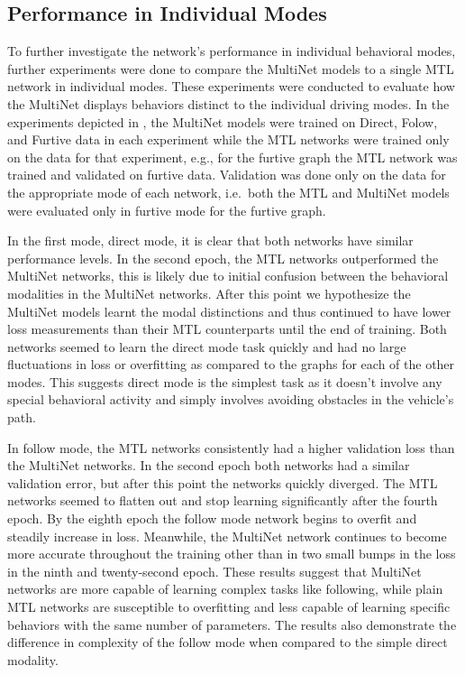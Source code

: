 \subsection{Performance in Individual Modes}
\label{resultspt2}
To further investigate the network's performance in individual behavioral modes, further experiments were done to compare the MultiNet models to a single MTL network in individual modes. These experiments were conducted to evaluate how the MultiNet displays behaviors distinct to the individual driving modes. In the experiments depicted in , the MultiNet models were trained on Direct, Folow, and Furtive data in each experiment while the MTL networks were trained only on the data for that experiment, e.g., for the furtive graph the MTL network was trained and validated on furtive data. Validation was done only on the data for the appropriate mode of each network, i.e.\, both the MTL and MultiNet models were evaluated only in furtive mode for the furtive graph.

In the first mode, direct mode, it is clear that both networks have similar performance levels. In the second epoch, the MTL networks outperformed the MultiNet networks, this is likely due to initial confusion between the behavioral modalities in the MultiNet networks. After this point we hypothesize the MultiNet models learnt the modal distinctions and thus continued to have lower loss measurements than their MTL counterparts until the end of training. Both networks seemed to learn the direct mode task quickly and had no large fluctuations in loss or overfitting as compared to the graphs for each of the other modes. This suggests direct mode is the simplest task as it doesn't involve any special behavioral activity and simply involves avoiding obstacles in the vehicle's path. 

In follow mode, the MTL networks consistently had a higher validation loss than the MultiNet networks. In the second epoch both networks had a similar validation error, but after this point the networks quickly diverged. The MTL networks seemed to flatten out and stop learning significantly after the fourth epoch. By the eighth epoch the follow mode network begins to overfit and steadily increase in loss. Meanwhile, the MultiNet network continues to become more accurate throughout the training other than in two small bumps in the loss in the ninth and twenty-second epoch. These results suggest that MultiNet networks are more capable of learning complex tasks like following, while plain MTL networks are susceptible to overfitting and less capable of learning specific behaviors with the same number of parameters. The results also demonstrate the difference in complexity of the follow mode when compared to the simple direct modality.

